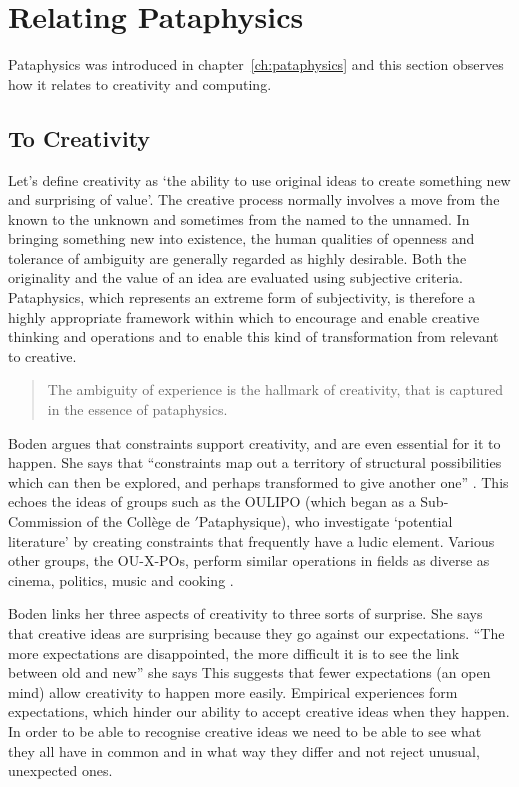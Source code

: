\section{Relating Pataphysics}

Pataphysics was introduced in chapter~\ref{ch:pataphysics} and this section observes how it relates to creativity and computing.

\subsection{To Creativity}

Let's define creativity as `the ability to use original ideas to create something new and surprising of value'. The creative process normally involves a move from the known to the unknown and sometimes from the named to the unnamed. In bringing something new into existence, the human qualities of openness and tolerance of ambiguity are generally regarded as highly desirable. Both the originality and the value of an idea are evaluated using subjective criteria. Pataphysics, which represents an extreme form of subjectivity, is therefore a highly appropriate framework within which to encourage and enable creative thinking and operations and to enable this kind of transformation from relevant to creative.

\begin{quotation}
  The ambiguity of experience is the hallmark of creativity, that is captured in the essence of pataphysics. 
\end{quotation}

Boden argues that constraints support creativity, and are even essential for it to happen. She says that ``constraints map out a territory of structural possibilities which can then be explored, and perhaps transformed to give another one'' \autocite*{Boden2003}. This echoes the ideas of groups such as the \ac{OULIPO} (which began as a Sub-Commission of the Collège de $'$Pataphysique), who investigate `potential literature' by creating constraints that frequently have a ludic element. Various other groups, the OU-X-POs, perform similar operations in fields as diverse as cinema, politics, music and cooking \autocite{Motte2007}.

Boden links her three aspects of creativity to three sorts of surprise. She says that creative ideas are surprising because they go against our expectations. ``The more expectations are disappointed, the more difficult it is to see the link between old and new'' she says \autocite*{Boden2003} This suggests that fewer expectations (an open mind) allow creativity to happen more easily. Empirical experiences form expectations, which hinder our ability to accept creative ideas when they happen. In order to be able to recognise creative ideas we need to be able to see what they all have in common and in what way they differ and not reject unusual, unexpected ones.

